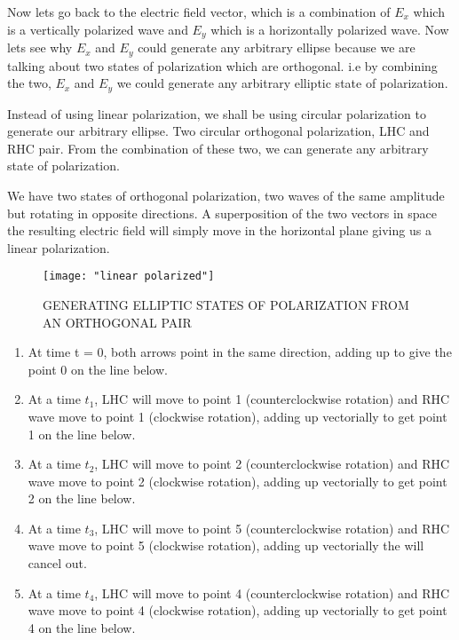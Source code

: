 	Now lets go back to the electric field vector, which is a combination of $E_{x}$ which is a vertically polarized wave and $E_{y}$ which is a horizontally polarized wave. Now lets see why $E_{x}$ and $E_{y}$ could generate any arbitrary ellipse because we are talking about two states of polarization which are orthogonal. i.e by combining the two, $E_{x}$ and $E_{y}$ we could generate any arbitrary elliptic state of polarization.
	
	Instead of using linear polarization, we shall be using circular polarization to generate our arbitrary ellipse. Two circular orthogonal polarization, LHC and RHC pair. From the combination of these two, we can generate any arbitrary state of polarization. 
	
	We have two states of orthogonal polarization, two waves of the same amplitude but rotating in opposite directions. A superposition of the two vectors in space the resulting electric field will simply move in the horizontal plane giving us a linear polarization.
	
	\begin{figure}
		\centering
		\texttt{[image: "linear polarized"]}
		\caption{GENERATING ELLIPTIC STATES OF POLARIZATION FROM AN ORTHOGONAL PAIR}
		\label{fig:linear-polarized}
	\end{figure}
	
	

	

	\begin{enumerate}
		\item At time t = 0, both arrows point in the same direction, adding up to give the point 0 on the line below.
		
		\item At a time $ t_{1} $, LHC will move to point 1 (counterclockwise rotation) and RHC wave move to point 1 (clockwise rotation), adding up vectorially to get point 1 on the line below.
		
		\item At a time $ t_{2} $, LHC will move to point 2 (counterclockwise rotation) and RHC wave move to point 2 (clockwise rotation), adding up vectorially to get point 2 on the line below.
		
		\item At a time $ t_{3} $, LHC will move to point 5 (counterclockwise rotation) and RHC wave move to point 5 (clockwise rotation), adding up vectorially the will cancel out.
		
		\item At a time $ t_{4} $, LHC will move to point 4 (counterclockwise rotation) and RHC wave move to point 4 (clockwise rotation), adding up vectorially to get point 4 on the line below.
	\end{enumerate}
	
